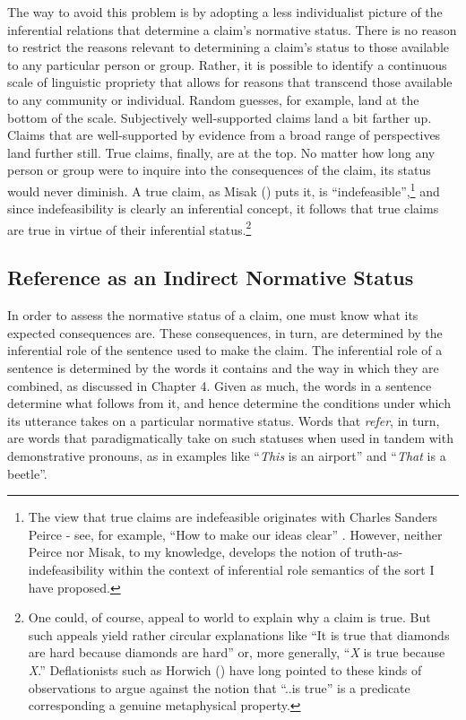 The way to avoid this problem is by adopting a less individualist picture of the inferential relations that determine a claim's normative status. There is no reason to restrict the reasons relevant to determining a claim's status to those available to any particular person or group. Rather, it is possible to identify a continuous scale of linguistic propriety that allows for reasons that transcend those available to any community or individual. Random guesses, for example, land at the bottom of the scale. Subjectively well-supported claims land a bit farther up. Claims that are well-supported by evidence from a broad range of perspectives land further still. True claims, finally, are at the top. No matter how long any person or group were to inquire into the consequences of the claim, its status would never diminish. A true claim, as Misak (\citeyear{Misak:2013}) puts it, is ``indefeasible'',\footnote{The view that true claims are indefeasible originates with Charles Sanders Peirce - see, for example, ``How to make our ideas clear'' \citep{Peirce:1992}. However, neither Peirce nor Misak, to my knowledge, develops the notion of truth-as-indefeasibility within the context of inferential role semantics of the sort I have proposed.} and since indefeasibility is clearly an inferential concept, it follows that true claims are true in virtue of their inferential status.\footnote{One could, of course, appeal to world to explain why a claim is true. But such appeals yield rather circular explanations like ``It is true that diamonds are hard because diamonds are hard'' or, more generally, ``\textit{X} is true because \textit{X}.'' Deflationists such as Horwich (\citeyear{Horwich:2005}) have long pointed to these kinds of observations to argue against the notion that ``..is true'' is a predicate corresponding a genuine metaphysical property.}

\subsection{Reference as an Indirect Normative Status}

In order to assess the normative status of a claim, one must know what its expected consequences are. These consequences, in turn, are determined by the inferential role of the sentence used to make the claim. The inferential role of a sentence is determined by the words it contains and the way in which they are combined, as discussed in Chapter 4. Given as much, the words in a sentence determine what follows from it, and hence determine the conditions under which its utterance takes on a particular normative status. Words that \textit{refer}, in turn, are words that paradigmatically take on such statuses when used in tandem with demonstrative pronouns, as in examples like ``\textit{This} is an airport'' and ``\textit{That} is a beetle''. 

